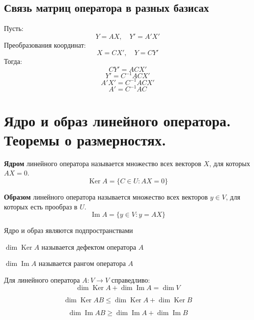\documentclass[14pt]{extreport}
\DeclareMathOperator{\Ima}{Im}
\DeclareMathOperator{\Ker}{Ker}
\begin{document}
    \section{Связь матриц оператора в разных базисах}
    Пусть:
    $$
    Y=AX, \quad Y'=A'X'
    $$
    Преобразования координат:
    $$
    X=CX', \quad Y=CY'
    $$
    Тогда:
    $$
    CY'=ACX'
    $$
    $$
    Y' = C^{-1}ACX'
    $$
    $$
    A'X'=C^{-1}ACX'
    $$
    $$
    \boxed{A'=C^{-1}AC}
    $$

    \chapter{Ядро и образ линейного оператора. Теоремы о размерностях.}
    \begin{defbox}
        \textbf{Ядром} линейного оператора называется множество всех векторов $X$, для которых $AX=0$.
        $$
        \Ker A = \lbrace C \in U : AX = 0 \rbrace
        $$
    \end{defbox}
    \begin{defbox}
        \textbf{Образом} линейного оператора называется множество всех векторов $y \in V$, для которых есть прообраз в $U$.
        $$
        \Ima A = \lbrace y \in V : y = AX \rbrace
        $$
    \end{defbox}
    \begin{impbox}
        Ядро и образ являются подпространствами
    \end{impbox}
    \begin{defbox}
        $\dim \Ker A$ называется дефектом оператора $A$
        
        $\dim \Ima A$ называется рангом оператора $A$%
    \end{defbox}
    \begin{thbox}
        Для линейного оператора $A: V \rightarrow V$ справедливо:
        $$
        \dim \Ker A + \dim \Ima A = \dim V
        $$
    \end{thbox}
    \begin{thbox}
        $$
        \dim \Ker AB \le \dim\Ker A + \dim\Ker B
        $$
    \end{thbox}
    \begin{thbox}
        $$
        \dim \Ima AB \ge \dim\Ima A + \dim\Ima B
        $$
    \end{thbox}
\end{document}
